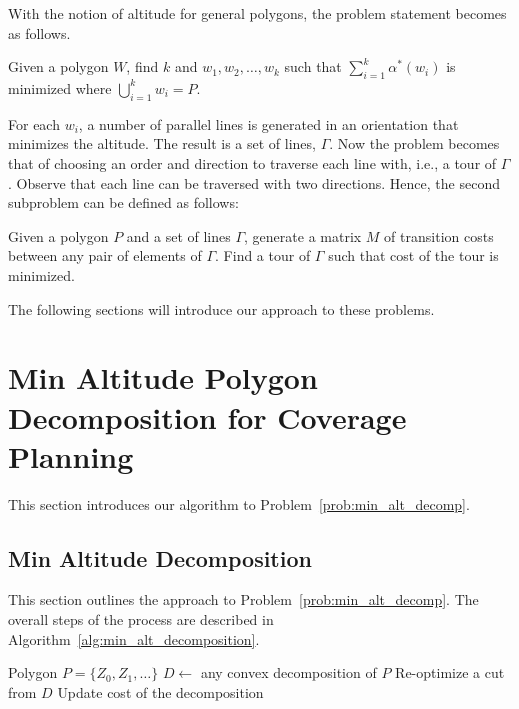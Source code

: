 \documentclass[../main.tex]{subfiles}
\begin{document}
With the notion of altitude for general polygons, the problem statement becomes as follows.
\begin{problem}
\label{prob:min_alt_decomp}
Given a polygon $W$, find $k$ and $w_1,w_2,\ldots,w_k$ such that $\sum^k_{i=1}\alpha^*(w_i)$ is minimized where $\bigcup^k_{i=1}w_i=P$.
\end{problem}

For each $w_i$, a number of parallel lines is generated in an orientation that minimizes the altitude. The result is a set of lines, $\Gamma$. Now the problem becomes that of choosing an order and direction to traverse each line with, i.e., a tour of $\Gamma$. Observe that each line can be traversed with two directions. Hence, the second subproblem can be defined as follows:

\begin{problem}
\label{prob:min_tour}
Given a polygon $P$ and a set of lines $\Gamma$, generate a matrix $M$ of transition costs between any pair of elements of $\Gamma$. Find a tour of $\Gamma$ such that cost of the tour is minimized.
\end{problem}

The following sections will introduce our approach to these problems.

\section{Min Altitude Polygon Decomposition for Coverage Planning}
\label{section:min_alt_decomposition}

This section introduces our algorithm to Problem~\ref{prob:min_alt_decomp}.

\subsection{Min Altitude Decomposition}
This section outlines the approach to Problem~\ref{prob:min_alt_decomp}. The overall steps of the process are described in Algorithm~\ref{alg:min_alt_decomposition}.
\begin{algorithm}
	\caption{$\operatorname{min\_alt\_decomposition}(P)$}
	\label{alg:min_alt_decomposition}
	\begin{algorithmic}[1]
		\REQUIRE Polygon $P=\{Z_0,Z_1,\ldots\}$
			\STATE $D\gets$ any convex decomposition of $P$	\label{line:cvx_decomp}
			\REPEAT
				\STATE Re-optimize a cut from $D$ \label{line:opt_cut_2}
				\STATE Update cost of the decomposition \label{line:update_cost}
	\end{algorithmic}
\end{algorithm}
\end{document}
